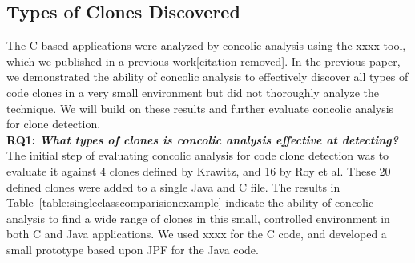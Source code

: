 \documentclass{sig-alternate}
\newif\ifisnopii
\begin{document}
\subsection{Types of Clones Discovered} %




The C-based applications were analyzed by concolic analysis using the \ifisnopii Concolic Code Clone Detection (CCCD) tool which we published in a previous work~\cite{wcre2013}.\else xxxx tool, which we published in a previous work[citation removed]. \fi In the previous paper, we demonstrated the ability of concolic analysis to effectively discover all types of code clones in a very small environment but did not thoroughly analyze the technique. We will build on these results and further evaluate concolic analysis for clone detection. \\



\textbf{RQ1: \emph{What types of clones is concolic analysis effective at detecting?}}
The initial step of evaluating concolic analysis for code clone detection was to evaluate it against 4 clones defined by Krawitz, and 16 by Roy et al. These 20 defined clones were added to a single Java and C file. The results in Table~\ref{table:singleclasscomparisionexample} indicate the ability of concolic analysis to find a wide range of clones in this small, controlled environment in both C and Java applications. We used \ifisnopii CCCD \else xxxx \fi for the C code, and developed a small prototype based upon JPF for the Java code.
\end{document}
